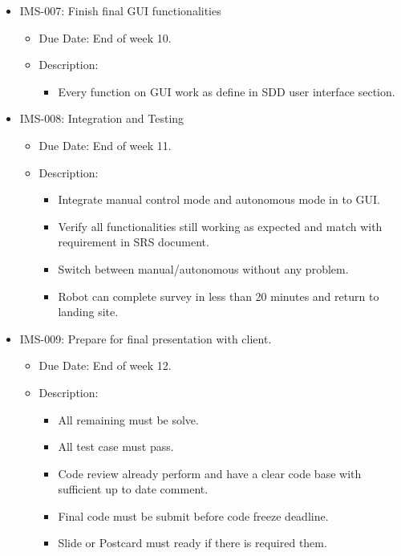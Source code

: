 \documentclass[11pt, a4paper]{article}
\begin{document}
\begin{itemize}
\begin{itemize}
\begin{itemize}
					\end{itemize}
				\end{itemize}
				\item IMS-007: Finish final GUI functionalities
					\begin{itemize}
					\item Due Date: End of week 10.
					\item Description:
					\begin{itemize}
						\item Every function on GUI work as define in SDD user interface section.
					\end{itemize}
				\end{itemize}
				\item IMS-008: Integration and Testing
				\begin{itemize}
					\item Due Date: End of week 11.
					\item Description:
					\begin{itemize}
						\item Integrate manual control mode and autonomous mode in to GUI.
						\item Verify all functionalities still working as expected and match with requirement in SRS document.
						\item Switch between manual/autonomous without any problem.
						\item Robot can complete survey in less than 20 minutes and return to landing site.
					\end{itemize}
				\end{itemize}
				\item IMS-009: Prepare for final presentation with client.
				\begin{itemize}
					\item Due Date: End of week 12.
					\item Description:
					\begin{itemize}
						\item All remaining must be solve.
						\item All test case must pass.
						\item Code review already perform and have a clear code base with sufficient up to date comment.
						\item Final code must be submit before code freeze deadline.
						\item Slide or Postcard must ready if there is required them.
					\end{itemize}
				\end{itemize}
			\end{itemize}
\end{document}
